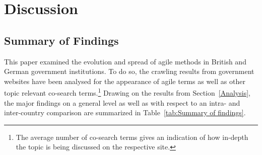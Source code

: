 \section{Discussion}\label{Discussion}
\subsection{Summary of Findings}\label{Summary of Findings}
This paper examined the evolution and spread of agile methods in British and German government institutions. To do so, the crawling results from government websites have been analysed for the appearance of agile terms as well as other topic relevant co-search terms.\footnote{The average number of co-search terms gives an indication of how in-depth the topic is being discussed on the respective site.} Drawing on the results from Section~\ref{Analysis}, the major findings on a general level as well as with respect to an intra- and inter-country comparison are summarized in Table~\ref{tab:Summary of findings}.

